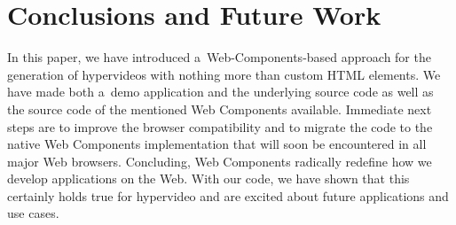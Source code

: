\documentclass[runningheads,a4paper]{llncs}
\begin{document}
\section{Conclusions and Future Work}

In this paper, we have introduced a~Web-Components-based approach
for the generation of hypervideos with nothing more than custom HTML elements.
We have made both a~demo application and the underlying source code
as well as the source code of the mentioned Web Components available.
Immediate next steps are to improve the browser compatibility
and to migrate the code to the native Web Components implementation
that will soon be encountered in all major Web browsers.
Concluding, Web Components radically redefine how we develop applications
on the Web.
With our code, we have shown that this certainly holds true for hypervideo
and are excited about future applications and use cases.



\end{document}
